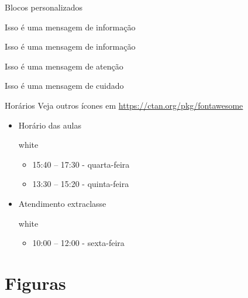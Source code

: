 \documentclass[aspectratio=169]{beamer}
\begin{document}
\begin{frame}{Blocos personalizados}

    \begin{informacao}
    Isso é uma mensagem de informação
    \end{informacao}
    
    \begin{informacaoazul}
        Isso é uma mensagem de informação
    \end{informacaoazul}

    \begin{atencao}
        Isso é uma mensagem de atenção
    \end{atencao}
    
    \begin{cuidado}
        Isso é uma mensagem de cuidado
    \end{cuidado}
\end{frame}

\begin{frame}{Horários}
    {Veja outros ícones em \url{https://ctan.org/pkg/fontawesome}}
    \begin{itemize}
        \item Horário das aulas 
        \begin{caixa}[azul]{white}{\faCalendar}
            \begin{itemize}
                \item 15:40 -- 17:30 - quarta-feira
                \item 13:30 -- 15:20 - quinta-feira
            \end{itemize}
        \end{caixa}
        \item Atendimento extraclasse
        \begin{caixa}[azul]{white}{\faCalendar}
            \begin{itemize}
                \item 10:00 -- 12:00 - sexta-feira
            \end{itemize}
        \end{caixa}
    \end{itemize}
\end{frame}


\section{Figuras}
\end{document}

